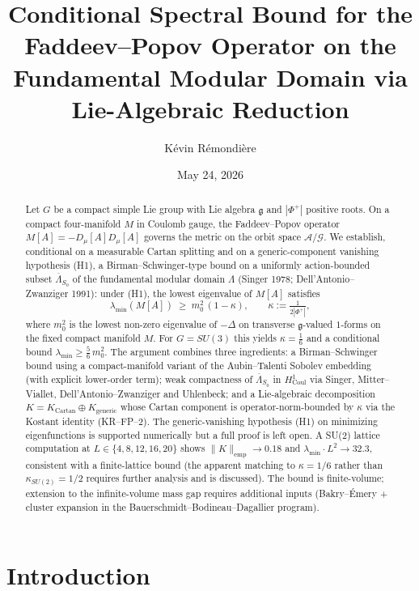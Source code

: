 \documentclass[11pt,a4paper]{amsart}
\title[Conditional Faddeev--Popov gap]{Conditional Spectral Bound for the Faddeev--Popov Operator on the Fundamental Modular Domain via Lie-Algebraic Reduction}
\author{K\'evin R\'emondi\`ere}
\date{May 24, 2026}
\theoremstyle{definition}
\newcommand{\g}{\mathfrak{g}}
\newcommand{\Coul}{\mathrm{Coul}}
\begin{document}
\begin{abstract}
Let $G$ be a compact simple Lie group with Lie algebra $\g$ and $|\Phi^+|$ positive roots. On a compact four-manifold $M$ in Coulomb gauge, the Faddeev--Popov operator $M[A] = -D_\mu[A] D_\mu[A]$ governs the metric on the orbit space $\mathcal A/\mathcal G$. We establish, conditional on a measurable Cartan splitting and on a generic-component vanishing hypothesis (H1), a Birman--Schwinger-type bound on a uniformly action-bounded subset $\overline{\Lambda}_{S_0}$ of the fundamental modular domain $\Lambda$ (Singer 1978; Dell'Antonio--Zwanziger 1991): under (H1), the lowest eigenvalue of $M[A]$ satisfies
\[
  \lambda_{\min}(M[A]) \;\geq\; m_0^{2}\,(1-\kappa), \qquad \kappa := \tfrac{1}{2|\Phi^+|},
\]
where $m_0^2$ is the lowest non-zero eigenvalue of $-\Delta$ on transverse $\g$-valued $1$-forms on the fixed compact manifold $M$. For $G = SU(3)$ this yields $\kappa = \tfrac{1}{6}$ and a conditional bound $\lambda_{\min} \geq \tfrac{5}{6}\,m_0^2$. The argument combines three ingredients: a Birman--Schwinger bound using a compact-manifold variant of the Aubin--Talenti Sobolev embedding (with explicit lower-order term); weak compactness of $\overline\Lambda_{S_0}$ in $H^1_{\Coul}$ via Singer, Mitter--Viallet, Dell'Antonio--Zwanziger and Uhlenbeck; and a Lie-algebraic decomposition $K = K_{\mathrm{Cartan}} \oplus K_{\mathrm{generic}}$ whose Cartan component is operator-norm-bounded by $\kappa$ via the Kostant identity (KR--FP--2). The generic-vanishing hypothesis (H1) on minimizing eigenfunctions is supported numerically but a full proof is left open. A SU(2) lattice computation at $L \in \{4,8,12,16,20\}$ shows $\|K\|_{\mathrm{emp}} \to 0.18$ and $\lambda_{\min} \cdot L^2 \to 32.3$, consistent with a finite-lattice bound (the apparent matching to $\kappa = 1/6$ rather than $\kappa_{SU(2)} = 1/2$ requires further analysis and is discussed). The bound is finite-volume; extension to the infinite-volume mass gap requires additional inputs (Bakry--\'Emery + cluster expansion in the Bauerschmidt--Bodineau--Dagallier program).
\end{abstract}

\maketitle

\section{Introduction}
\label{sec:intro}
\end{document}
